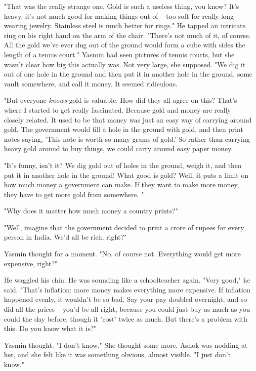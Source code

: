 "That was the really strange one. Gold is such a useless thing, you
know? It's heavy, it's not much good for making things out of --
too soft for really long-wearing jewelry. Stainless steel is much
better for rings." He tapped an intricate ring on his right hand on
the arm of the chair. "There's not much of it, of course. All the
gold we've ever dug out of the ground would form a cube with sides
the length of a tennis court." Yasmin had seen pictures of tennis
courts, but she wasn't clear how big this actually was. Not very
large, she supposed. "We dig it out of one hole in the ground and
then put it in another hole in the ground, some vault somewhere,
and call it money. It seemed ridiculous.

"But everyone \emph{knows} gold is valuable. How did they all agree
on this? That's where I started to get really fascinated. Because
gold and money are really closely related. It used to be that money
was just an easy way of carrying around gold. The government would
fill a hole in the ground with gold, and then print notes saying,
'This note is worth so many grams of gold.' So rather than carrying
heavy gold around to buy things, we could carry around easy paper
money.

"It's funny, isn't it? We dig gold out of holes in the ground,
weigh it, and then put it in another hole in the ground! What good
is gold? Well, it puts a limit on how much money a government can
make. If they want to make more money, they have to get more gold
from somewhere. "

"Why does it matter how much money a country prints?"

"Well, imagine that the government decided to print a crore of
rupees for every person in India. We'd all be rich, right?"

Yasmin thought for a moment. "No, of course not. Everything would
get more expensive, right?"

He waggled his chin. He was sounding like a schoolteacher again.
"Very good," he said. "That's inflation: more money makes
everything more expensive. If inflation happened evenly, it
wouldn't be so bad. Say your pay doubled overnight, and so did all
the prices -- you'd be all right, because you could just buy as
much as you could the day before, though it 'cost' twice as much.
But there's a problem with this. Do you know what it is?"

Yasmin thought. "I don't know." She thought some more. Ashok was
nodding at her, and she felt like it was something obvious, almost
visible. "I just don't know."

